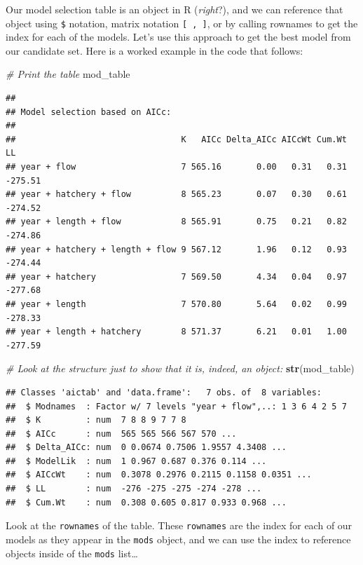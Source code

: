 \documentclass[
]{book}
\newenvironment{Shaded}{\begin{snugshade}}{\end{snugshade}}
\newcommand{\CommentTok}[1]{\textcolor[rgb]{0.56,0.35,0.01}{\textit{#1}}}
\newcommand{\KeywordTok}[1]{\textcolor[rgb]{0.13,0.29,0.53}{\textbf{#1}}}
\newcommand{\NormalTok}[1]{#1}
\begin{document}
Our model selection table is an object in R (\emph{right}?), and we can reference that object using \texttt{\$} notation, matrix notation \texttt{{[}\ ,\ {]}}, or by calling rownames to get the index for each of the models. Let's use this approach to get the best model from our candidate set. Here is a worked example in the code that follows:

\begin{Shaded}
\begin{Highlighting}[]
\CommentTok{# Print the table}
\NormalTok{mod_table}
\end{Highlighting}
\end{Shaded}

\begin{verbatim}
## 
## Model selection based on AICc:
## 
##                                 K   AICc Delta_AICc AICcWt Cum.Wt      LL
## year + flow                     7 565.16       0.00   0.31   0.31 -275.51
## year + hatchery + flow          8 565.23       0.07   0.30   0.61 -274.52
## year + length + flow            8 565.91       0.75   0.21   0.82 -274.86
## year + hatchery + length + flow 9 567.12       1.96   0.12   0.93 -274.44
## year + hatchery                 7 569.50       4.34   0.04   0.97 -277.68
## year + length                   7 570.80       5.64   0.02   0.99 -278.33
## year + length + hatchery        8 571.37       6.21   0.01   1.00 -277.59
\end{verbatim}

\begin{Shaded}
\begin{Highlighting}[]
\CommentTok{# Look at the structure just to show that it is, indeed, an object:}
\KeywordTok{str}\NormalTok{(mod_table)}
\end{Highlighting}
\end{Shaded}

\begin{verbatim}
## Classes 'aictab' and 'data.frame':	7 obs. of  8 variables:
##  $ Modnames  : Factor w/ 7 levels "year + flow",..: 1 3 6 4 2 5 7
##  $ K         : num  7 8 8 9 7 7 8
##  $ AICc      : num  565 565 566 567 570 ...
##  $ Delta_AICc: num  0 0.0674 0.7506 1.9557 4.3408 ...
##  $ ModelLik  : num  1 0.967 0.687 0.376 0.114 ...
##  $ AICcWt    : num  0.3078 0.2976 0.2115 0.1158 0.0351 ...
##  $ LL        : num  -276 -275 -275 -274 -278 ...
##  $ Cum.Wt    : num  0.308 0.605 0.817 0.933 0.968 ...
\end{verbatim}

Look at the \texttt{rownames} of the table. These \texttt{rownames} are the index for each of our models as they appear in the \texttt{mods} object, and we can use the index to reference objects inside of the \texttt{mods} list\ldots{}
\end{document}
